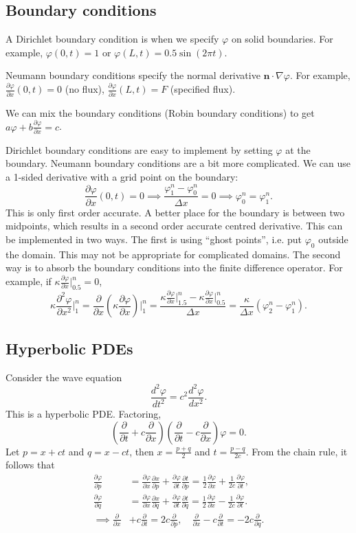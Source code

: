 \documentclass[11pt, a4paper]{article}
\renewcommand{\phi}{\varphi}
\theoremstyle{break}
\newcommand*{\Paren}[1]{\left(#1\right)}%
\newcommand{\ve}{\mathbf} %
\newcommand{\dx}{\Delta x}
\newcommand{\der}[2]{\frac{\partial #1}{\partial #2}}
\newcommand{\pder}[3][2]{\frac{\partial^#1 #2}{\partial #3^#1}}
\newcommand{\ddder}[3][2]{\frac{d^#1 #2}{d #3^#1}}
\newcommand{\eval}[1]{\big\rvert_{#1}}
\newcommand{\Eval}[1]{\bigg\rvert_{#1}}
\begin{document}
\subsection{Boundary conditions}
A Dirichlet boundary condition is when we specify $\phi$ on solid boundaries. For example, $\phi(0,t)=1$ or $\phi(L,t)=0.5\sin(2\pi t)$.

Neumann boundary conditions specify the normal derivative $\ve n\cdot\nabla\phi$. For example, $\der\phi x(0,t)=0$ (no flux), $\der\phi x(L,t)=F$ (specified flux).

We can mix the boundary conditions (Robin boundary conditions) to get $a\phi+b\der\phi x=c$.

Dirichlet boundary conditions are easy to implement by setting $\phi$ at the boundary. Neumann boundary conditions are a bit more complicated. We can use a 1-sided derivative with a grid point on the boundary: \[\der\phi x(0,t)=0\implies \frac{\phi_1^n-\phi_0^n}{\dx}=0\implies \phi_0^n=\phi_1^n.\] This is only first order accurate. A better place for the boundary is between two midpoints, which results in a second order accurate centred derivative. This can be implemented in two ways. The first is using ``ghost points'', i.e. put $\phi_0$ outside the domain. This may not be appropriate for complicated domains. The second way is to absorb the boundary conditions into the finite difference operator. For example, if $\kappa \der\phi x\eval{0.5}^n=0$, \[\kappa \pder\phi x\Eval1^n=\der{}x\Paren{\kappa\der\phi x}\Eval 1^n=\frac{\kappa\der\phi x\eval{1.5}^n-\kappa \der\phi x\eval{0.5}^n}{\dx}=\frac{\kappa}{\dx}(\phi_2^n-\phi_1^n).\]


\subsection{Hyperbolic PDEs}
Consider the wave equation \[\ddder\phi t = c^2 \ddder\phi x.  \] This is a hyperbolic PDE. Factoring, \begin{equation}\label{eq:waveRe}\Paren{\der{}t + c\der{}x}\Paren{\der{}{t}-c\der{}x}\phi = 0.\end{equation} Let $p=x+ct$ and $q=x-ct$, then $x=\frac{p+q}2$ and $t=\frac{p-q}{2c}$. From the chain rule, it follows that \begin{align*}\der\phi p&=\der\phi x\der xp+\der\phi t\der tp=\frac12\der\phi x+\frac1{2c}\der\phi t,\\\der\phi q&=\der\phi x\der xq+\der\phi t\der tq=\frac12\der\phi x -\frac{1}{2c}\der \phi t.\\
\implies \der{}x&+c\der{}t = 2c\der{}p,\quad \der{}x-c\der{}t=-2c\der{}q.
\end{align*}
\end{document}

